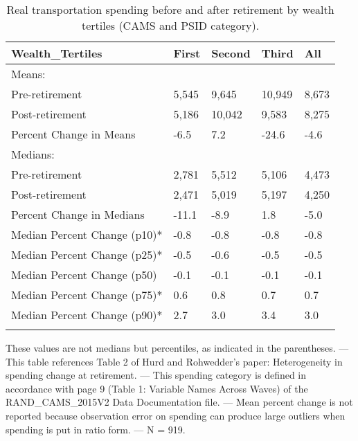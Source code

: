\begin{table}[tbp] \centering
{}

\caption{Real transportation spending before and after retirement by wealth tertiles (CAMS and PSID category).}
\begin{tabularx}{\textwidth}{lCCCC}

\toprule
{Wealth\_Tertiles}&{First}&{Second}&{Third}&{All} \tabularnewline
\midrule\addlinespace[1.5ex]
Means:&&&& \tabularnewline
\midrule Pre-retirement&5,545&9,645&10,949&8,673 \tabularnewline
Post-retirement&5,186&10,042&9,583&8,275 \tabularnewline
Percent Change in Means&-6.5&7.2&-24.6&-4.6 \tabularnewline
\midrule Medians:&&&& \tabularnewline
\midrule Pre-retirement&2,781&5,512&5,106&4,473 \tabularnewline
Post-retirement&2,471&5,019&5,197&4,250 \tabularnewline
Percent Change in Medians&-11.1&-8.9&1.8&-5.0 \tabularnewline
Median Percent Change (p10)*&-0.8&-0.8&-0.8&-0.8 \tabularnewline
Median Percent Change (p25)*&-0.5&-0.6&-0.5&-0.5 \tabularnewline
Median Percent Change (p50)&-0.1&-0.1&-0.1&-0.1 \tabularnewline
Median Percent Change (p75)*&0.6&0.8&0.7&0.7 \tabularnewline
Median Percent Change (p90)*&2.7&3.0&3.4&3.0 \tabularnewline
\bottomrule \addlinespace[1.5ex]

\end{tabularx}
\begin{flushleft}
\footnotesize *These values are not medians but percentiles, as indicated in the parentheses. \linebreak --- \linebreak This table references Table 2 of Hurd and Rohwedder's paper: Heterogeneity in spending change at retirement. \linebreak --- \linebreak This spending category is defined in accordance with page 9 (Table 1: Variable Names Across Waves) of the RAND\_CAMS\_2015V2 Data Documentation file. \linebreak --- \linebreak Mean percent change is not reported because observation error on spending can produce large outliers when spending is put in ratio form. \linebreak --- \linebreak N = 919.
\end{flushleft}
\end{table}
